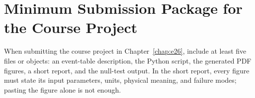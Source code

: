 \section{Minimum Submission Package for the Course Project}
\label{appsec:e-project-package}

When submitting the course project in Chapter~\ref{chap:e26}, include at least five files or objects: an event-table description, the Python script, the generated PDF figures, a short report, and the null-test output. In the short report, every figure must state its input parameters, units, physical meaning, and failure modes; pasting the figure alone is not enough.
